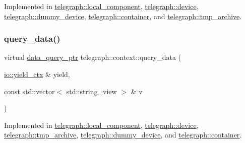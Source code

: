 Implemented in \hyperlink{classtelegraph_1_1local__component_a4410ca44a41de1c139273efd31f281c4}{telegraph\+::local\+\_\+component}, \hyperlink{classtelegraph_1_1device_a4c46c7e98bf5a573a9966fd2cc199021}{telegraph\+::device}, \hyperlink{classtelegraph_1_1dummy__device_a23b7704d488ca5e9ac732256621e8137}{telegraph\+::dummy\+\_\+device}, \hyperlink{classtelegraph_1_1container_a1a9849e53091061da81e7c1a73502e47}{telegraph\+::container}, and \hyperlink{classtelegraph_1_1tmp__archive_a7f2d18d2a4c9a7fd65d9752c8f4ce4d5}{telegraph\+::tmp\+\_\+archive}.

\mbox{\label{classtelegraph_1_1context_a34793623d2a2def580ad0b8710c74c6d}} 
\subsubsection{\texorpdfstring{query\+\_\+data()}{query\_data()}\hspace{0.1cm}{\footnotesize\ttfamily [2/2]}}
{\footnotesize\ttfamily virtual \hyperlink{namespacetelegraph_a6ffe775ac48dca2a4013b53d692199c8}{data\+\_\+query\+\_\+ptr} telegraph\+::context\+::query\+\_\+data (\begin{DoxyParamCaption}\item[{\hyperlink{structboost_1_1asio_1_1yield__ctx}{io\+::yield\+\_\+ctx} \&}]{yield,  }\item[{const std\+::vector$<$ std\+::string\+\_\+view $>$ \&}]{v }\end{DoxyParamCaption})\hspace{0.3cm}{\ttfamily [pure virtual]}}



Implemented in \hyperlink{classtelegraph_1_1local__component_ad8c3abb4f9e6ab31b0590beac901eec5}{telegraph\+::local\+\_\+component}, \hyperlink{classtelegraph_1_1device_a9a5ef799aadf591a355cc1e50442d762}{telegraph\+::device}, \hyperlink{classtelegraph_1_1tmp__archive_a8a860d67e3733e2eee7a8315942450e5}{telegraph\+::tmp\+\_\+archive}, \hyperlink{classtelegraph_1_1dummy__device_ae7820cd8f1d5683ccc90b7256e88a735}{telegraph\+::dummy\+\_\+device}, and \hyperlink{classtelegraph_1_1container_aca8b0b22be3cde48f0bc5f3fa79b29da}{telegraph\+::container}.

\mbox{\label{classtelegraph_1_1context_a6765d7fa22fe99b9a6723c511396b781}} 
